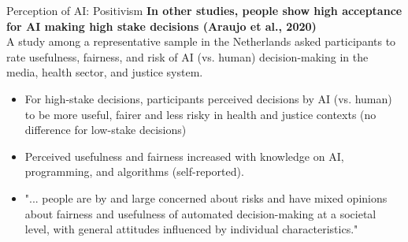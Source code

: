 \documentclass[8pt]{beamer}
\begin{document}
	\begin{frame}[t]{Perception of AI: Positivism}
		\textbf{In other studies, people show high acceptance for AI making high stake decisions (Araujo et al., 2020)}\\
		A study among a representative sample in the Netherlands asked participants to rate usefulness, fairness, and risk of AI (vs. human) decision-making in the media, health sector, and justice system.
		\begin{itemize}
			\item For high-stake decisions, participants perceived decisions by AI (vs. human) to be more useful, fairer and less risky in health and justice contexts (no difference for low-stake decisions)
			\item Perceived usefulness and fairness increased with knowledge on AI, programming, and algorithms (self-reported).
			\item "... people are by and large concerned about risks and have mixed opinions about fairness and usefulness of automated decision-making at a societal level, with general attitudes influenced by individual characteristics."
		\end{itemize}
		\centering
		\vspace{1.9cm}
	\end{frame}
\end{document}
